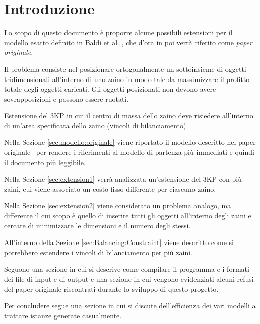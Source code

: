 \section{Introduzione}
\setcounter{equation}{4}

Lo scopo di questo documento è proporre alcune possibili estensioni per il 
modello esatto definito in Baldi et al. \cite{Baldi20129802}, 
che d'ora in poi verrà riferito come \emph{paper originale}.

\begin{problem}[3KP]
Il problema consiste nel posizionare ortogonalmente un sottoinsieme di 
oggetti tridimensionali all'interno di uno zaino in modo tale da 
massimizzare il profitto totale degli oggetti caricati. 
Gli oggetti posizionati non devono avere sovrapposizioni e possono 
essere ruotati.
\end{problem}

\begin{problem}[3BKP]
Estensione del 3KP in cui il centro di massa dello zaino deve risiedere
all'interno di un'area specificata dello zaino (vincoli di bilanciamento).
\end{problem}

Nella Sezione \ref{sec:modello:originale} viene riportato il modello descritto 
nel paper originale~\cite{Baldi20129802} per rendere i riferimenti al modello
di partenza più immediati e quindi il documento più leggibile.

Nella Sezione \ref{sec:extension1} verrà analizzata un'estensione del 3KP con 
più zaini, cui viene associato un costo fisso differente per ciascuno zaino.

Nella Sezione \ref{sec:extension2} viene considerato un problema analogo, 
ma differente il cui scopo è quello di inserire tutti gli oggetti all'interno 
degli zaini e cercare di minimizzare le dimensioni e il numero degli stessi. 

All'interno della Sezione \ref{sec:Balancing:Constraint} viene descritto come 
si potrebbero estendere i vincoli di bilanciamento per più zaini. 


Seguono una sezione in cui si descrive come compilare il 
programma e i formati dei file di input e di output e una sezione in cui
vengono evidenziati alcuni refusi 
del paper originale riscontrati durante lo sviluppo di questo progetto.

Per concludere segue una sezione in cui si discute dell'efficienza dei vari
modelli a trattare istanze generate casualmente.

